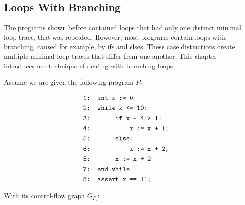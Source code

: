 \documentclass{article}
\newcommand\mycom[1]{}
\newcommand\mycom[1]{#1}
\newcommand{\jw}[1]{\mycom{\todo[color=blue!40,inline]{\small JW: #1}}}
\begin{document}
\subsection{Loops With Branching}
\jw{TODO: Text and defs}
The programs shown before contained loops that had only one distinct minimal loop trace, that was repeated. However, most programs contain loops with branching, caused for example, by ifs and elses. These case distinctions create multiple minimal loop traces that differ from one another. This chapter introduces our technique of dealing with branching loops. \\ \par
Assume we are given the following program $P_2$: \\
\begin{figure}[H]
	\begin{align*}
		&\texttt{1: int x := 0}; \\
		&\texttt{2: while x <= 10:} \\
		&\texttt{3: \hspace*{2em} if x - 4 > 1:} \\
		&\texttt{4: \hspace*{4em} x := x + 1;} \\
		&\texttt{5: \hspace*{2em} else:} \\
		&\texttt{6: \hspace*{4em} x := x + 2;} \\
		&\texttt{5: \hspace*{2em} x := x + 2} \\
		&\texttt{7: end while} \\
		&\texttt{8: assert x == 11;}
	\end{align*}
	\label{fig:square}
\end{figure}
With its control-flow graph $G_{P_2}$: \\
\end{document}
